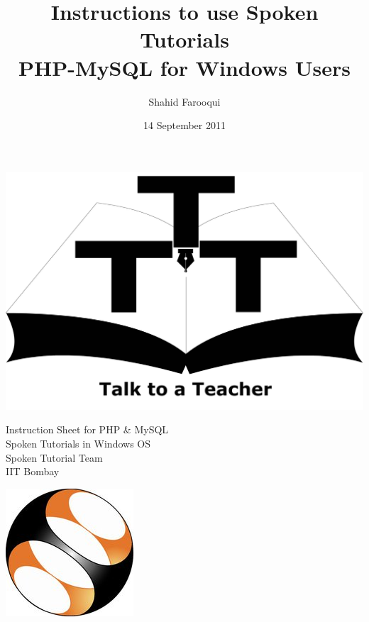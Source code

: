 \documentclass[11pt]{article}
\title{Instructions to use Spoken Tutorials \\
PHP-MySQL for Windows Users}
\author{Shahid Farooqui}
\date{14 September 2011}
\begin{document}
\begin{minipage}[t]{0.15\textwidth}
\includegraphics[width=\linewidth]{3t-logo}
\end{minipage} \hfill
\begin{minipage}[t]{0.65\textwidth}
\begin{center}
\vspace{-0.7in}
\Large
Instruction Sheet for PHP \& MySQL \\
Spoken Tutorials in Windows OS \\
\large
Spoken Tutorial Team \\
IIT Bombay \\
\end{center}
\end{minipage} \hfill
\begin{minipage}[t]{0.12\textwidth}
\includegraphics[width=\linewidth]{st-logo.jpg}
\end{minipage}
\end{document}
